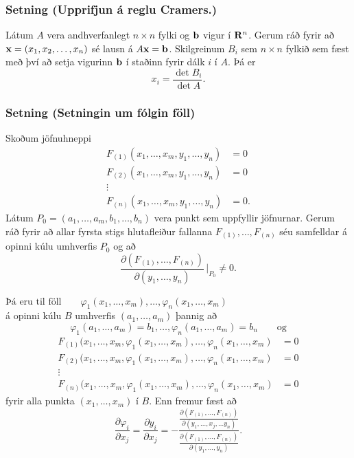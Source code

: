 \subsubsection{Setning   (Upprifjun á reglu Cramers.)}

 Látum $A$ vera andhverfanlegt
$n\times n$ fylki og $\mbox{${\bf b}$}$ vigur í $\mbox{${\bf R}^n$}$.  Gerum ráð fyrir að
$\mbox{${\bf x}$}=(x_1, x_2, \ldots, x_n)$ sé lausn á $A\mbox{${\bf x}$}=\mbox{${\bf b}$}$.  Skilgreinum
$B_i$ sem $n\times n$ fylkið sem fæst með því að setja vigurinn $\mbox{${\bf b}$}$
í staðinn fyrir dálk $i$ í $A$.  Þá er
$$x_i=\frac{\det B_i}{\det A}.$$




\subsubsection{Setning  (Setningin um fólgin föll)}
Skoðum jöfnuhneppi
\begin{align*}
F_{(1)}(x_1,\ldots,x_m, y_1, \ldots, y_n)&=0\\
F_{(2)}(x_1,\ldots,x_m, y_1, \ldots, y_n)&=0\\
\vdots\\
F_{(n)}(x_1,\ldots,x_m, y_1, \ldots, y_n)&=0.
\end{align*}
Látum $P_0=(a_1,\ldots, a_m, b_1,\ldots, b_n)$ vera punkt sem uppfyllir
jöfnurnar.   
Gerum ráð fyrir að allar fyrsta stigs
hlutafleiður fallanna $F_{(1)},\ldots, F_{(n)}$ séu samfelldar á opinni kúlu umhverfis $P_0$ og að
$$\frac{\partial(F_{(1)}, \ldots, F_{(n)})}
{\partial( y_1, \ldots, y_n)}\,\bigg|_{P_0}\neq 0.$$


$\text{Þá eru til föll} \qquad \varphi_1(x_1,\ldots,x_m),\ldots,\varphi_n(x_1,\ldots,x_m)$ \\
á opinni kúlu $B$ umhverfis $(a_1,\ldots,a_m)$
þannig að 
$$\varphi_1(a_1,\ldots,a_m)=b_1,\ldots,\varphi_n(a_1,\ldots,a_m)=b_n \qquad \text{og}$$
\begin{align*}
F_{(1)}(x_1,\ldots,x_m, \varphi_1(x_1,\ldots,x_m),\ldots,
\varphi_n(x_1,\ldots,x_m)&=0\\
F_{(2)}(x_1,\ldots,x_m, \varphi_1(x_1,\ldots,x_m),\ldots,
\varphi_n(x_1,\ldots,x_m)&=0\\
\vdots\\
F_{(n)}(x_1,\ldots,x_m, \varphi_1(x_1,\ldots,x_m),\ldots,
\varphi_n(x_1,\ldots,x_m)&=0
\end{align*}
fyrir alla punkta $(x_1,\ldots,x_m)$ í $B$.
Enn fremur fæst að %
$$\frac{\partial \varphi_i}{\partial x_j}
=\frac{\partial y_i}{\partial x_j}
=-\frac{\frac{\partial(F_{(1)}, \ldots, F_{(n)})}
{\partial( y_1, \ldots,x_j,\ldots y_n)}}
{\frac{\partial(F_{(1)}, \ldots, F_{(n)})}{\partial( y_1, \ldots, y_n)}}.$$



